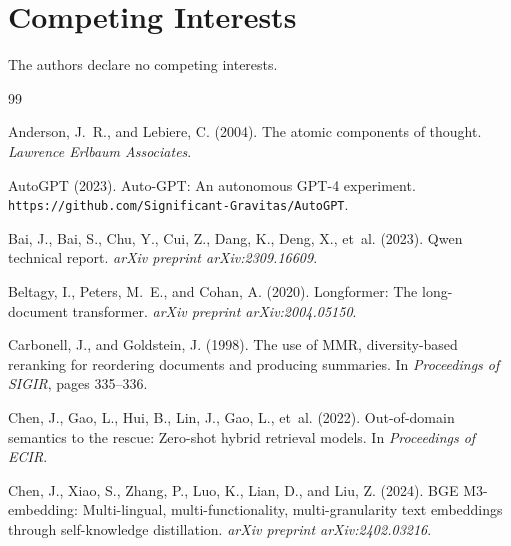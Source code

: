 \documentclass[review,12pt]{elsarticle}
\begin{document}
\section*{Competing Interests}
The authors declare no competing interests.




\begin{thebibliography}{99}

Anderson, J.~R., and Lebiere, C. (2004).
\newblock The atomic components of thought.
\newblock \textit{Lawrence Erlbaum Associates}.

AutoGPT (2023).
\newblock Auto-GPT: An autonomous GPT-4 experiment.
\newblock \texttt{https://github.com/Significant-Gravitas/AutoGPT}.

Bai, J., Bai, S., Chu, Y., Cui, Z., Dang, K., Deng, X., et~al. (2023).
\newblock Qwen technical report.
\newblock \textit{arXiv preprint arXiv:2309.16609}.

Beltagy, I., Peters, M.~E., and Cohan, A. (2020).
\newblock Longformer: The long-document transformer.
\newblock \textit{arXiv preprint arXiv:2004.05150}.

Carbonell, J., and Goldstein, J. (1998).
\newblock The use of MMR, diversity-based reranking for reordering documents
  and producing summaries.
\newblock In \textit{Proceedings of SIGIR}, pages 335--336.

Chen, J., Gao, L., Hui, B., Lin, J., Gao, L., et~al. (2022).
\newblock Out-of-domain semantics to the rescue: Zero-shot hybrid retrieval
  models.
\newblock In \textit{Proceedings of ECIR}.

Chen, J., Xiao, S., Zhang, P., Luo, K., Lian, D., and Liu, Z. (2024).
\newblock BGE M3-embedding: Multi-lingual, multi-functionality, multi-granularity
  text embeddings through self-knowledge distillation.
\newblock \textit{arXiv preprint arXiv:2402.03216}.


\end{thebibliography}
\end{document}
